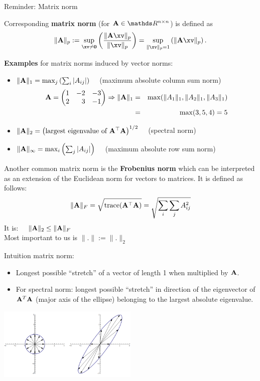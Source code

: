 \begin{vbframe}{Reminder: Matrix norm}
\framebreak 

Corresponding \textbf{matrix norm} (for $\Amat \in \R^{n \times n}$) is defined as
$$
\|\Amat\|_p := \sup_{\xv \not = \mathbf{0}}\left(\frac{\|\Amat \xv\|_p}{\|\xv\|_p}\right) =
  \sup_{\|\xv\|_p = 1} \left( \|\Amat\xv\|_p \right).
$$



\textbf{Examples} for matrix norms induced by vector norms:
\begin{itemize}
\item $\|\mathbf{A}\|_1 = \max_j\left(\sum_i |A_{ij}| \right) \quad$ (maximum absolute column sum norm)
  \begin{eqnarray*}
  \Amat = \begin{pmatrix*}[r]1 & -2 & -3 \\
  2 & 3 & -1\end{pmatrix*}\Rightarrow
  \|\Amat\|_1 &=& \max (\|A_1\|_1, \|A_2\|_1, \|A_3\|_1) \\
  &=& \max (3, 5, 4) = 5
  \end{eqnarray*}
\item $\|\mathbf{A}\|_2 = \left(\mbox{largest eigenvalue of } \mathbf{A}^\top\mathbf{A} \right)^{1/2} \quad$ (spectral norm)
\item $\|\mathbf{A}\|_\infty = \max_i\left(\sum_j |A_{ij}| \right) \quad$ (maximum absolute row sum norm)
\end{itemize}
\bigskip
Another common matrix norm is the \textbf{Frobenius norm} which can be interpreted as an extension of the Euclidean norm for vectors to matrices. It is defined as follows: 
$$
\|\mathbf{A}\|_F = \sqrt{\mbox{trace}(\mathbf{A}^\top\mathbf{A})} = \sqrt{ \sum_i \sum_j A_{ij}^2}
$$
It is: $\quad \|\mathbf{A}\|_2 \leq \|\mathbf{A}\|_F$\\
\medskip
Most important to us is $\|.\| := \|.\|_2$

\framebreak

Intuition matrix norm:
\begin{itemize}
\item Longest possible \enquote{stretch} of a vector of length 1 when multiplied by $\mathbf{A}$.
\item For spectral norm: longest possible \enquote{stretch} in direction of the eigenvector of $\mathbf{A}^T\mathbf{A}$ (major axis of the ellipse) belonging to the largest absolute eigenvalue.
\end{itemize}

\begin{center}
\includegraphics[width=0.5\textwidth]{figure_man/euklidischenorm.png}



\end{center}
\end{vbframe}

